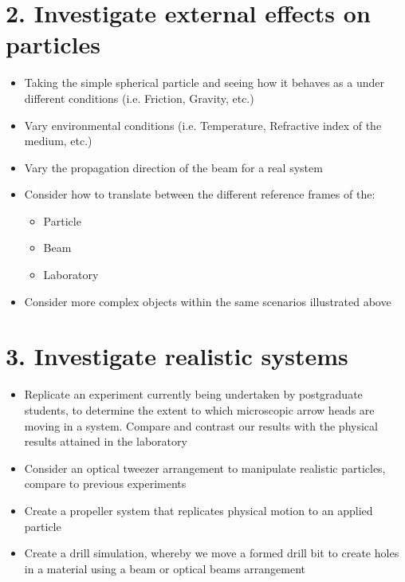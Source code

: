 \documentclass[11pt]{meetingmins}
\begin{document}
\section{2. Investigate external effects on particles}

\begin{itemize}

\item Taking the simple spherical particle and seeing how it behaves as a under different conditions (i.e. Friction, Gravity, etc.)

\item Vary environmental conditions (i.e. Temperature, Refractive index of the medium, etc.)

\item Vary the propagation direction of the beam for a real system

\item Consider how to translate between the different reference frames of the:

\begin{itemize}

\item Particle

\item Beam

\item Laboratory

\end{itemize}

\item Consider more complex objects within the same scenarios illustrated above

\end{itemize}

\section{3. Investigate realistic systems}

\begin{itemize}

\item Replicate an experiment currently being undertaken by postgraduate students, to determine the extent to which microscopic arrow heads are moving in a system. Compare and contrast our results with the physical results attained in the laboratory

\item Consider an optical tweezer arrangement to manipulate realistic particles, compare to previous experiments

\item Create a propeller system that replicates physical motion to an applied particle

\item Create a drill simulation, whereby we move a formed drill bit to create holes in a material using a beam or optical beams arrangement

\end{itemize}
\end{document}
